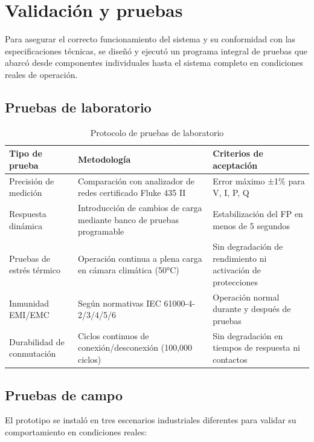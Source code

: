 \documentclass{report}          %
\begin{document}
        \section{Validación y pruebas}
            Para asegurar el correcto funcionamiento del sistema y su conformidad con las especificaciones técnicas, se diseñó y ejecutó un programa integral de pruebas que abarcó desde componentes individuales hasta el sistema completo en condiciones reales de operación.

            \subsection{Pruebas de laboratorio}
                \begin{table}[H]
                    \centering
                    \begin{tabular}{|p{4cm}|p{5cm}|p{5cm}|}
                        \hline
                        \textbf{Tipo de prueba} & \textbf{Metodología} & \textbf{Criterios de aceptación} \\
                        \hline
                        Precisión de medición & Comparación con analizador de redes certificado Fluke 435 II & Error máximo ±1\% para V, I, P, Q \\
                        \hline
                        Respuesta dinámica & Introducción de cambios de carga mediante banco de pruebas programable & Estabilización del FP en menos de 5 segundos \\
                        \hline
                        Pruebas de estrés térmico & Operación continua a plena carga en cámara climática (50°C) & Sin degradación de rendimiento ni activación de protecciones \\
                        \hline
                        Inmunidad EMI/EMC & Según normativas IEC 61000-4-2/3/4/5/6 & Operación normal durante y después de pruebas \\
                        \hline
                        Durabilidad de conmutación & Ciclos continuos de conexión/desconexión (100,000 ciclos) & Sin degradación en tiempos de respuesta ni contactos \\
                        \hline
                    \end{tabular}
                    \caption{Protocolo de pruebas de laboratorio}
                \end{table}

            \subsection{Pruebas de campo}
                El prototipo se instaló en tres escenarios industriales diferentes para validar su comportamiento en condiciones reales:
\end{document}
